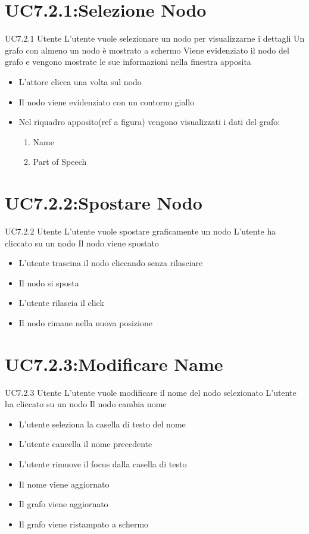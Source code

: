 \documentclass[../AnalisideiRequisiti.tex]{subfiles}
\begin{document}
\section{UC7.2.1:Selezione Nodo}
\UserCase
{UC7.2.1}
{Utente}
{}
{L'utente vuole selezionare un nodo per visualizzarne i dettagli}
{Un grafo con almeno un nodo è mostrato a schermo}
{Viene evidenziato il nodo del grafo e vengono mostrate le sue informazioni nella finestra apposita}
{}
{
	\begin{itemize}
		\item{} L'attore clicca una volta sul nodo
		\item{} Il nodo viene evidenziato con un contorno giallo
		\item{} Nel riquadro apposito(ref a figura) vengono visualizzati i dati del grafo:
		\begin{enumerate}
			\item{} Name
			\item{} Part of Speech
		\end{enumerate}
	\end{itemize}
}
\section{UC7.2.2:Spostare Nodo}
\UserCase
{UC7.2.2}
{Utente}
{}
{L'utente vuole spostare graficamente un nodo}
{L'utente ha cliccato su un nodo}
{Il nodo viene spostato}
{}
{\begin{itemize}
		\item{} L'utente trascina il nodo cliccando senza rilasciare
		\item{} Il nodo si sposta
		\item{} L'utente rilascia il click
		\item{} Il nodo rimane nella nuova posizione
\end{itemize}
}

\section{UC7.2.3:Modificare Name}
\UserCase
{UC7.2.3}
{Utente}
{}
{L'utente vuole modificare il nome del nodo selezionato}
{L'utente ha cliccato su un nodo}
{Il nodo cambia nome}
{}
{\begin{itemize}
		\item{} L'utente seleziona la casella di testo del nome
		\item{} L'utente cancella il nome precedente
		\item{} L'utente rimuove il focus dalla casella di testo
		\item{} Il nome viene aggiornato
		\item{} Il grafo viene aggiornato 
		\item{} Il grafo viene ristampato a schermo 
\end{itemize}}
\end{document}
